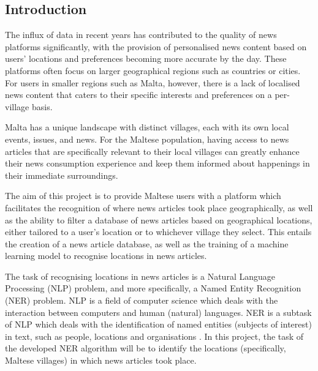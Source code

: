 \documentclass[a4paper, oneside, 11pt]{article}
\begin{document}
\begin{multicols*}{2}

  \begin{abstract}
    \textit{
      \lipsum[1]
    }
  \end{abstract}


  \section{Introduction}

  The influx of data in recent years has contributed to the quality of news platforms significantly, with the provision of personalised news content based on users' locations and preferences becoming more accurate by the day. These platforms often focus on larger geographical regions such as countries or cities. For users in smaller regions such as Malta, however, there is a lack of localised news content that caters to their specific interests and preferences on a per-village basis.

  Malta has a unique landscape with distinct villages, each with its own local events, issues, and news. For the Maltese population, having access to news articles that are specifically relevant to their local villages can greatly enhance their news consumption experience and keep them informed about happenings in their immediate surroundings.

  The aim of this project is to provide Maltese users with a platform which facilitates the recognition of where news articles took place geographically, as well as the ability to filter a database of news articles based on geographical locations, either tailored to a user's location or to whichever village they select. This entails the creation of a news article database, as well as the training of a machine learning model to recognise locations in news articles.

  The task of recognising locations in news articles is a Natural Language Processing (NLP) problem, and more specifically, a Named Entity Recognition (NER) problem. NLP is a field of computer science which deals with the interaction between computers and human (natural) languages. NER is a subtask of NLP which deals with the identification of named entities (subjects of interest) in text, such as people, locations and organisations \cite{nadeau2007survey}. In this project, the task of the developed NER algorithm will be to identify the locations (specifically, Maltese villages) in which news articles took place.


\end{multicols*}
\end{document}
